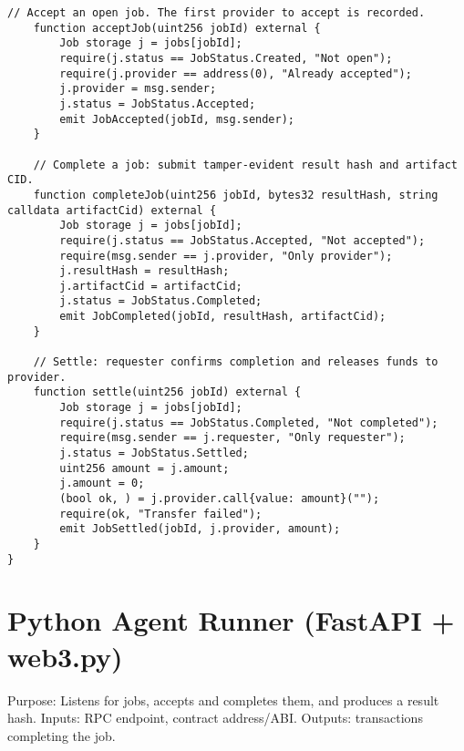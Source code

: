 \begin{lstlisting}[language=Solidity,caption={DeVAAEscrow.sol}]
    // Accept an open job. The first provider to accept is recorded.
    function acceptJob(uint256 jobId) external {
        Job storage j = jobs[jobId];
        require(j.status == JobStatus.Created, "Not open");
        require(j.provider == address(0), "Already accepted");
        j.provider = msg.sender;
        j.status = JobStatus.Accepted;
        emit JobAccepted(jobId, msg.sender);
    }

    // Complete a job: submit tamper-evident result hash and artifact CID.
    function completeJob(uint256 jobId, bytes32 resultHash, string calldata artifactCid) external {
        Job storage j = jobs[jobId];
        require(j.status == JobStatus.Accepted, "Not accepted");
        require(msg.sender == j.provider, "Only provider");
        j.resultHash = resultHash;
        j.artifactCid = artifactCid;
        j.status = JobStatus.Completed;
        emit JobCompleted(jobId, resultHash, artifactCid);
    }

    // Settle: requester confirms completion and releases funds to provider.
    function settle(uint256 jobId) external {
        Job storage j = jobs[jobId];
        require(j.status == JobStatus.Completed, "Not completed");
        require(msg.sender == j.requester, "Only requester");
        j.status = JobStatus.Settled;
        uint256 amount = j.amount;
        j.amount = 0;
        (bool ok, ) = j.provider.call{value: amount}("");
        require(ok, "Transfer failed");
        emit JobSettled(jobId, j.provider, amount);
    }
}
\end{lstlisting}

\section{Python Agent Runner (FastAPI + web3.py)}
\noindent Purpose: Listens for jobs, accepts and completes them, and produces a result hash. Inputs: RPC endpoint, contract address/ABI. Outputs: transactions completing the job.

